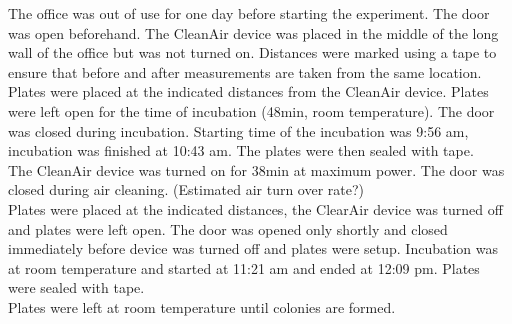 \documentclass[hyperref]{labbook}
\begin{document}
The office was out of use for one day before starting the experiment. The door was open beforehand. The CleanAir device was placed in the middle of the long wall of the office but was not turned on. Distances were marked using a tape to ensure that before and after measurements are taken from the same location. Plates were placed at the indicated distances from the CleanAir device. Plates were left open for the time of incubation (48min, room temperature). The door was closed during incubation. Starting time of the incubation was 9:56 am, incubation was finished at 10:43 am. The plates were then sealed with tape.\\
The CleanAir device was turned on for 38min at maximum power. The door was closed during air cleaning. (Estimated air turn over rate?)\\
Plates were placed at the indicated distances, the ClearAir device was turned off and plates were left open. The door was opened only shortly and closed immediately before device was turned off and plates were setup. Incubation was at room temperature and started at 11:21 am and ended at 12:09 pm. Plates were sealed with tape.\\
Plates were left at room temperature until colonies are formed. 
\end{document}
